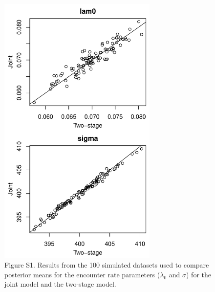 \documentclass[12pt]{article}
\begin{document}
\clearpage

\begin{figure}[h!]
  \centering
  \includegraphics[width=0.7\textwidth]{sim/sim-lam0sig}
  \caption{Figure S1. Results from the 100 simulated datasets used to
    compare posterior means for the encounter rate parameters
    ($\lambda_0$ and $\sigma$) for the joint model and the two-stage
    model. }   
  \label{fig:sim-lam0sig}
\end{figure}


\clearpage
\end{document}
